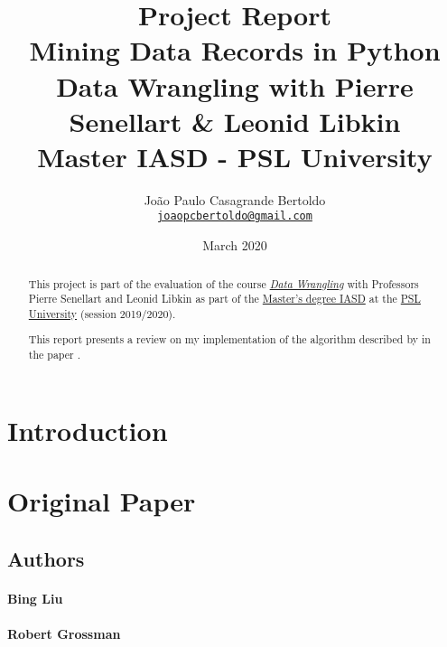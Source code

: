 \documentclass[11pt]{article}
\title{
    \huge Project Report \\ 
    Mining Data Records in Python \\ 
    \medskip
    \large Data Wrangling with Pierre Senellart \& Leonid Libkin  \\
    Master IASD - PSL University
}
\author{
    João Paulo Casagrande Bertoldo \\
    \href{mailto:joaopcbertoldo@gmail.com}{\texttt{joaopcbertoldo@gmail.com}} 
}
\date{March 2020}
\begin{document}
{
    \maketitle

    \begin{abstract}
    
    This project is part of the evaluation of the course \href{https://moodle.di.ens.fr/enrol/index.php?id=14}{\textit{Data Wrangling}} with Professors Pierre Senellart and Leonid Libkin as part of the \href{https://www.lamsade.dauphine.fr/wp/iasd/en/}{Master's degree IASD} at the \href{https://www.psl.eu/en}{PSL University} (session 2019/2020).
    \medskip
    
    This report presents a review on my implementation of the algorithm described by \cite{mdr} in the paper . 

    \end{abstract}
}

\tableofcontents
\newpage


\section{Introduction}

\cite{mdr}

\cite{mdr}

\citep{mdr}

\citet{mdr}

\cite{mdr-technical}

\section{Original Paper}

\subsection{Authors}

\paragraph{Bing Liu}

\paragraph{Robert Grossman}
\end{document}
